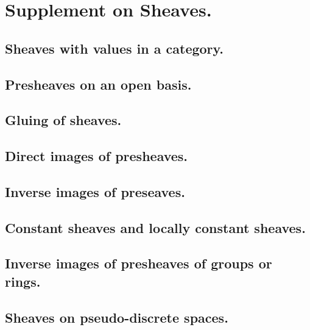 \documentclass[10pt,oneside]{amsart}
\begin{document}
    \section{Supplement on Sheaves.}

        \subsection{Sheaves with values in a category.}
        

        \subsection{Presheaves on an open basis.}
        

        \subsection{Gluing of sheaves.}
        

        \subsection{Direct images of presheaves.}
        

        \subsection{Inverse images of preseaves.}
        

        \subsection{Constant sheaves and locally constant sheaves.}
        

        \subsection{Inverse images of presheaves of groups or rings.}
        

        \subsection{Sheaves on pseudo-discrete spaces.}
        
\end{document}
